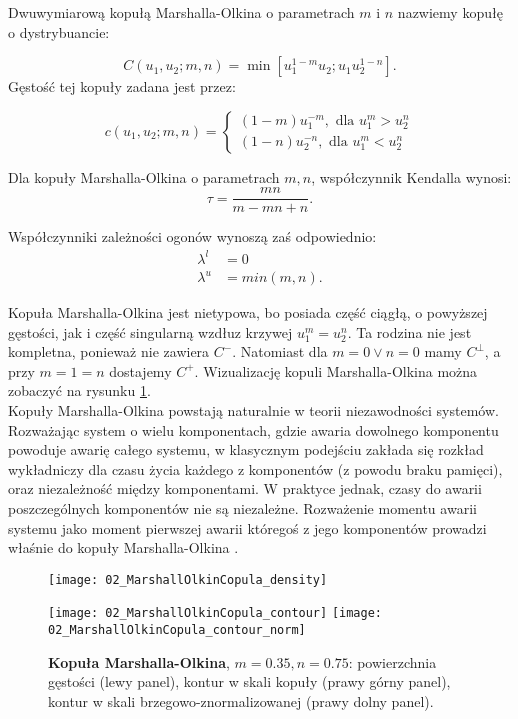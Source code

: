 \begin{df}
	Dwuwymiarową kopułą Marshalla-Olkina o parametrach $m$ i $n$ nazwiemy kopułę o dystrybuancie:
	
	$$ C(u_1, u_2; m,n) = \min[u_1^{1-m}u_2; u_1u_2^{1-n}].$$
	Gęstość tej kopuły zadana jest przez:
	
	$$
	c(u_1, u_2;m,n)=
	\begin{cases}
		(1-m)u_1^{-m},\text{ dla }u_1^m>u_2^n\\
		(1-n)u_2^{-n},\text{ dla }u_1^m<u_2^n
	\end{cases}
	$$	
\end{df}
\begin{prop}
	Dla kopuły Marshalla-Olkina o parametrach $m,n$, współczynnik Kendalla wynosi:
	$$ \tau = \frac{mn}{m-mn+n}.$$
	
	Współczynniki zależności ogonów wynoszą zaś odpowiednio:
	\begin{equation}
		\begin{split}
			\lambda^{l}&=0\\
			\lambda^{u}&=min(m,n).
		\end{split}
	\end{equation}
\end{prop}
Kopuła Marshalla-Olkina jest nietypowa, bo posiada część ciągłą, o powyższej gęstości, jak i część singularną wzdłuz krzywej $u_1^m=u_2^n$. Ta rodzina nie jest kompletna, ponieważ nie zawiera $C^{-}$. Natomiast dla $m=0 \vee n=0$ mamy $C^{\perp}$, a przy $m=1=n$ dostajemy $C^{+}$. Wizualizację kopuli Marshalla-Olkina można zobaczyć na rysunku \ref{fig:marshall_olkin_copula_density}.\\
Kopuły Marshalla-Olkina powstają naturalnie w teorii niezawodności systemów. Rozważając system o wielu komponentach, gdzie awaria dowolnego komponentu powoduje awarię całego systemu, w klasycznym podejściu zakłada się rozkład wykładniczy dla czasu życia każdego z komponentów (z powodu braku pamięci), oraz niezależność między komponentami. W praktyce jednak, czasy do awarii poszczególnych komponentów nie są niezależne. Rozważenie momentu awarii systemu jako moment pierwszej awarii któregoś z jego komponentów prowadzi właśnie do kopuły Marshalla-Olkina \cite{Matus2019}.\\

\begin{figure}[h]
	\centering
	\begin{minipage}{0.5\linewidth}
		\texttt{[image: 02\_MarshallOlkinCopula\_density]}
	\end{minipage}
	\begin{minipage}{0.45\linewidth}
		\texttt{[image: 02\_MarshallOlkinCopula\_contour]}
		\texttt{[image: 02\_MarshallOlkinCopula\_contour\_norm]}
	\end{minipage}
	\caption{\textbf{Kopuła Marshalla-Olkina}, $m=0.35,n=0.75$: powierzchnia gęstości (lewy panel), kontur w skali kopuły (prawy górny panel), kontur w skali brzegowo-znormalizowanej (prawy dolny panel). \label{fig:marshall_olkin_copula_density}}
\end{figure}



